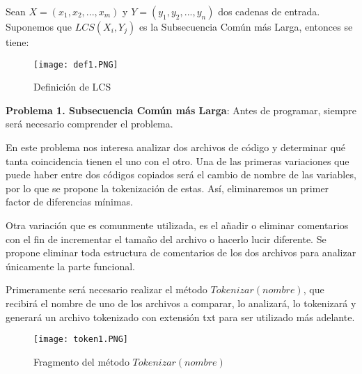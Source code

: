 \documentclass[12pt,twoside]{article}
\begin{document}
Sean $X = (x_1 , x_2, ... , x_m)$ y $Y = (y_1, y_2, ... , y_n)$ dos cadenas de entrada. Suponemos que $LCS(X_i, Y_j)$ es la Subsecuencia Com\'un m\'as Larga, entonces se tiene:

\vspace{5mm} %

\begin{figure}[htb]
\centering
\texttt{[image: def1.PNG]}
\caption{Definici\'on de LCS}
\end{figure}

\vspace{5mm} %

\newpage

\textbf{Problema 1. Subsecuencia Com\'un m\'as Larga}: Antes de programar, siempre ser\'a necesario comprender el problema. 

En este problema nos interesa analizar dos archivos de c\'odigo y determinar qu\'e tanta coincidencia tienen el uno con el otro. Una de las primeras variaciones que puede haber entre dos c\'odigos copiados ser\'a el cambio de nombre de las variables, por lo que se propone la tokenizaci\'on de estas. As\'i, eliminaremos un primer factor de diferencias m\'inimas.

\vspace{5mm} %

Otra variaci\'on que es comunmente utilizada, es el añadir o eliminar comentarios con el fin de incrementar el tamaño del archivo o hacerlo lucir diferente. Se propone eliminar toda estructura de comentarios de los dos archivos para analizar \'unicamente la parte funcional.

\vspace{5mm} %

Primeramente ser\'a necesario realizar el m\'etodo $Tokenizar(nombre)$, que recibir\'a el nombre de uno de los archivos a comparar, lo analizar\'a, lo tokenizar\'a y generar\'a un archivo tokenizado con extensi\'on txt para ser utilizado m\'as adelante. 

\vspace{0cm}

\begin{figure}[htb]
\centering
\texttt{[image: token1.PNG]}
\caption{Fragmento del m\'etodo $Tokenizar(nombre)$}
\end{figure}

\vspace{0cm}
\end{document}

